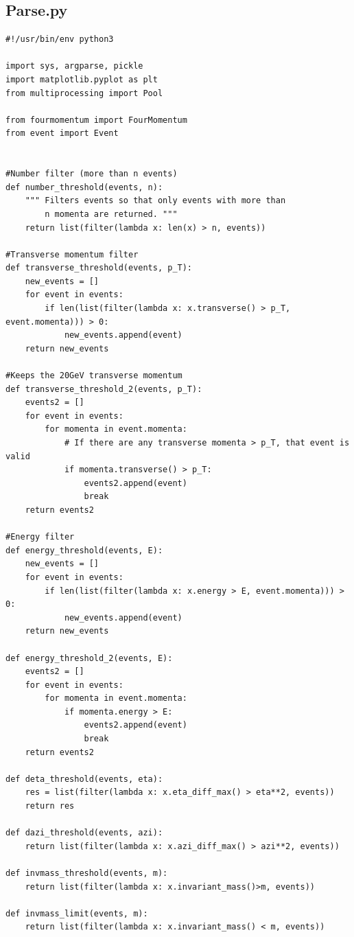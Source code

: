 \documentclass{article}
\begin{document}
\subsection{Parse.py}
\begin{lstlisting}
#!/usr/bin/env python3

import sys, argparse, pickle
import matplotlib.pyplot as plt
from multiprocessing import Pool

from fourmomentum import FourMomentum
from event import Event


#Number filter (more than n events)
def number_threshold(events, n):
    """ Filters events so that only events with more than
        n momenta are returned. """
    return list(filter(lambda x: len(x) > n, events))

#Transverse momentum filter
def transverse_threshold(events, p_T):
    new_events = []
    for event in events:
        if len(list(filter(lambda x: x.transverse() > p_T, event.momenta))) > 0:
            new_events.append(event)
    return new_events

#Keeps the 20GeV transverse momentum
def transverse_threshold_2(events, p_T):
    events2 = []
    for event in events:
        for momenta in event.momenta:
            # If there are any transverse momenta > p_T, that event is valid
            if momenta.transverse() > p_T:
                events2.append(event)
                break
    return events2

#Energy filter
def energy_threshold(events, E):
    new_events = []
    for event in events:
        if len(list(filter(lambda x: x.energy > E, event.momenta))) > 0:
            new_events.append(event)
    return new_events

def energy_threshold_2(events, E):
    events2 = []
    for event in events:
        for momenta in event.momenta:
            if momenta.energy > E:
                events2.append(event)
                break
    return events2

def deta_threshold(events, eta):
    res = list(filter(lambda x: x.eta_diff_max() > eta**2, events))
    return res

def dazi_threshold(events, azi):
    return list(filter(lambda x: x.azi_diff_max() > azi**2, events))

def invmass_threshold(events, m):
    return list(filter(lambda x: x.invariant_mass()>m, events))

def invmass_limit(events, m):
    return list(filter(lambda x: x.invariant_mass() < m, events))


\end{lstlisting}
\end{document}
